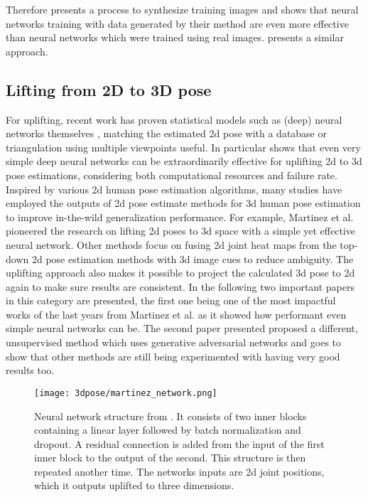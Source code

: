  Therefore \cite{Chen2016} presents a process to synthesize training images and shows that neural networks training with data generated by their method are even more effective than neural networks which were trained using real images. \cite{Rogez2016} presents a similar approach.

\subsection{Lifting from 2D to 3D pose}
For uplifting, recent work has proven statistical models such as (deep) neural networks themselves \cite{Tome_2017_CVPR, Martinez_2017_ICCV}, matching the estimated 2d pose with a database \cite{Chen_2017_CVPR} or triangulation using multiple viewpoints \cite{Dong_2019_CVPR} useful. In particular \cite{Martinez_2017_ICCV} shows that even very simple deep neural networks can be extraordinarily effective for uplifting 2d to 3d pose estimations, considering both computational resources and failure rate.
\newline
Inspired by various 2d human pose estimation algorithms, many studies have employed the outputs of 2d pose estimate methods for 3d human pose estimation to improve in-the-wild generalization performance. For example, Martinez et al. \cite{Martinez_2017_ICCV} pioneered the research on lifting 2d poses to 3d space with a simple yet effective neural network. Other methods \cite{park_3d_2016, zhou_hemlets_2019, habibie_wild_2019, tekin_learning_2017} focus on fusing 2d joint heat maps from the top-down 2d pose estimation methods with 3d image cues to reduce ambiguity. The uplifting approach also makes it possible to project the calculated 3d pose to 2d again to make sure results are consistent. \cite{wang_deep_2021} In the following two important papers in this category are presented, the first one being one of the most impactful works of the last years from Martinez et al. as it showed how performant even simple neural networks can be. The second paper presented proposed a different, unsupervised method which uses generative adversarial networks and goes to show that other methods are still being experimented with having very good results too.

\begin{figure*}[!htb]
	\centering
	\texttt{[image: 3dpose/martinez\_network.png]}
	\caption{Neural network structure from \cite{Martinez_2017_ICCV}. It consists of two inner blocks containing a linear layer followed by batch normalization and dropout. A residual connection is added from the input of the first inner block to the output of the second. This structure is then repeated another time. The networks inputs are 2d joint positions, which it outputs uplifted to three dimensions.}
	\label{fig:martinez-network}
\end{figure*}

